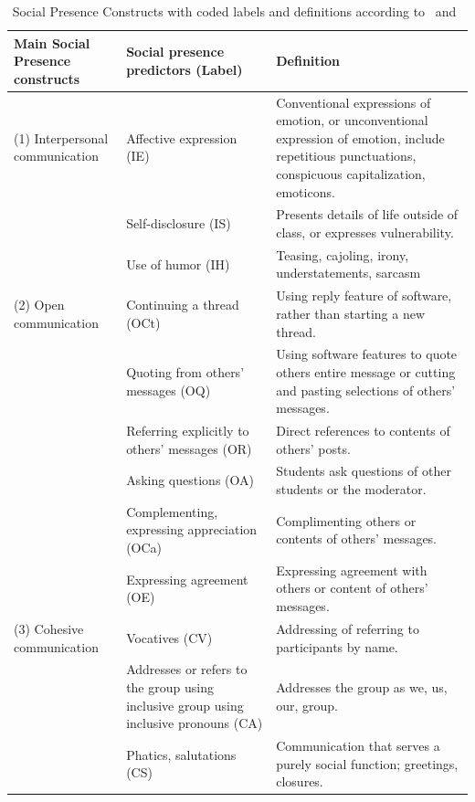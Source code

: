 \documentclass[format=acmsmall, review=false, screen=true]{acmart}
\begin{document}
\begin{table}[h!]
\caption{Social Presence Constructs with coded labels and definitions according to~\cite{joksimovic2015social} and~\cite{garrison2009communities}}
 \label{tab:Social}
\begin{center}
 \begin{tabular}{p{3cm}|p{4cm}|p{5cm}}
 \toprule
 \centering Main Social Presence constructs & \centering	Social presence predictors (Label) & Definition \\
 \midrule
 (1) Interpersonal communication & Affective expression (IE) & Conventional expressions of emotion, or unconventional expression of emotion, include repetitious punctuations, conspicuous capitalization, emoticons. 
 \\ \hline
 & Self-disclosure (IS) & Presents details of life outside of class, or expresses vulnerability.
 \\ \hline
 & Use of humor (IH) & Teasing, cajoling, irony, understatements, sarcasm
 \\ \hline
 (2) Open communication & Continuing a thread (OCt) & Using reply feature of software, rather than starting a new thread.
 \\ \hline
 & Quoting from others’ messages (OQ) & Using software features to quote others entire message or cutting and pasting selections of others' messages.
 \\ \hline
 & Referring explicitly to others’ messages (OR) & Direct references to contents of others' posts.
 \\ \hline
 & Asking questions (OA) & Students ask questions of other students or the moderator.
 \\ \hline
 & Complementing, expressing appreciation (OCa) & Complimenting others or contents of others' messages.
 \\ \hline
 & Expressing agreement (OE) & Expressing agreement with others or content of others' messages.
 \\ \hline
 (3) Cohesive communication & Vocatives (CV) & Addressing of referring to participants by name.
 \\ \hline
 & Addresses or refers to the group using inclusive group using inclusive pronouns (CA) & Addresses the group as we, us, our, group.
 \\ \hline
 & Phatics, salutations (CS) & Communication that serves a purely social function; greetings, closures.
 \\ \hline
 \end{tabular}
 \end{center}
 \end{table}
\end{document}
